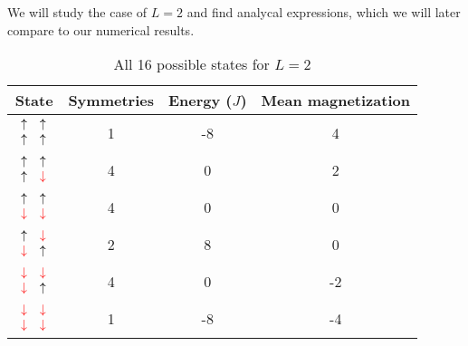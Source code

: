 \documentclass[a4paper]{article}
\begin{document}
 We will study the case of $L = 2$ and find analycal expressions, which we will later compare to our numerical results.
\begin{table}[htb]
\begin{center}
\begin{tabular}{cccc}
    State & Symmetries & Energy ($J$) & Mean magnetization \\ \hline
    $ \begin{array}{cc}
        \uparrow&\uparrow \\
        \uparrow&\uparrow
    \end{array} $ &
    1 & %
    -8 & %
    4   %
    \\ \hline
    $ \begin{array}{cc}
        \uparrow&\uparrow \\
        \uparrow&{\color{red}\downarrow}
    \end{array} $ &
    4 & %
    0 & %
    2   %
    \\ \hline
    $ \begin{array}{cc}
        \uparrow&\uparrow \\
        {\color{red}\downarrow}&{\color{red}\downarrow}
    \end{array} $ &
    4 & %
    0 & %
    0   %
    \\ \hline
    $ \begin{array}{cc}
        \uparrow&{\color{red}\downarrow} \\
        {\color{red}\downarrow}&\uparrow
    \end{array} $ &
    2 & %
    8 & %
    0   %
    \\ \hline
    $ \begin{array}{cc}
        {\color{red}\downarrow}&{\color{red}\downarrow} \\
        {\color{red}\downarrow}&\uparrow
    \end{array} $ &
    4 & %
    0 & %
    -2   %
    \\ \hline
    $ \begin{array}{cc}
        {\color{red}\downarrow}&{\color{red}\downarrow} \\
        {\color{red}\downarrow}&{\color{red}\downarrow}
    \end{array} $ &
    1 & %
    -8 & %
    -4   %
    \\ \hline
\end{tabular}
\end{center}
\caption{All 16 possible states for $L=2$}
\label{table:states}
\end{table}
\end{document}

